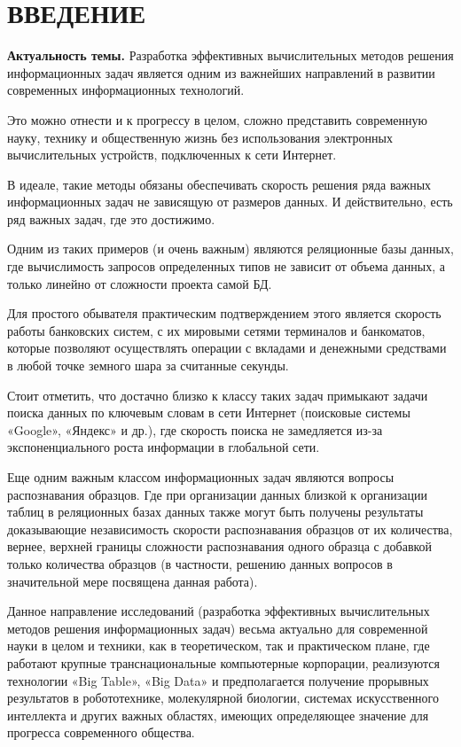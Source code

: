 \chapter*{ВВЕДЕНИЕ}							%

\textbf{Актуальность темы.}  Разработка эффективных вычислительных  методов решения информационных задач является одним из важнейших направлений в развитии современных информационных технологий.

Это можно отнести и к прогрессу в целом, сложно представить современную науку, технику  и общественную жизнь без использования электронных вычислительных устройств, подключенных к сети Интернет.

В идеале, такие методы обязаны обеспечивать скорость решения ряда важных информационных задач не зависящую от размеров данных. И действительно, есть ряд важных задач, где это достижимо. 

Одним из таких примеров (и очень важным) являются реляционные базы данных, где вычислимость запросов определенных типов не зависит от объема данных, а только линейно от сложности проекта самой БД.

Для простого обывателя практическим подтверждением этого является скорость работы банковских систем, с их мировыми сетями терминалов и банкоматов, которые позволяют осуществлять операции с вкладами и денежными средствами в любой точке земного шара за считанные секунды.

Стоит отметить, что достачно близко к классу таких задач примыкают задачи поиска данных по ключевым словам в сети Интернет (поисковые системы «Google», «Яндекс» и др.), где скорость поиска не замедляется из-за экспоненциального роста информации в глобальной сети.

Еще одним важным классом информационных задач являются вопросы распознавания образцов. Где при организации данных близкой к организации таблиц в реляционных базах данных также могут быть получены результаты доказывающие независимость скорости  распознавания  образцов от их количества, вернее, верхней границы сложности распознавания одного образца с добавкой только количества образцов (в частности, решению данных вопросов в значительной мере посвящена данная работа). 

Данное направление исследований (разработка эффективных вычислительных  методов решения информационных задач) весьма актуально для современной  науки в целом и техники, как в теоретическом, так и  практическом плане, где работают крупные транснациональные компьютерные корпорации, реализуются технологии «Big Table»,  «Big Data» и предполагается получение прорывных результатов в робототехнике, молекулярной биологии, системах искусственного интеллекта и других важных областях, имеющих определяющее значение для прогресса современного общества.

